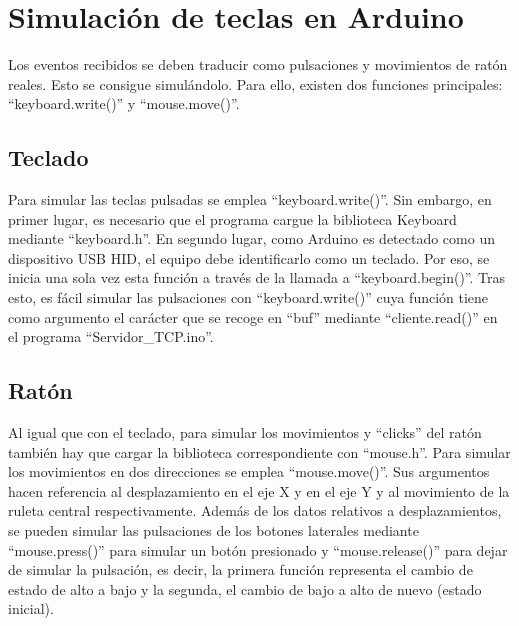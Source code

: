 \section{Simulación de teclas en Arduino} \label{s3_6}

Los eventos recibidos se deben traducir como pulsaciones y movimientos de ratón reales. Esto se consigue simulándolo. Para ello, existen dos funciones principales: ``keyboard.write()'' y ``mouse.move()''.

\subsection{Teclado} \label{s3_6_1}

Para simular las teclas pulsadas se emplea ``keyboard.write()''. Sin embargo, en primer lugar, es necesario que el programa cargue la biblioteca Keyboard mediante ``keyboard.h''. En segundo lugar, como Arduino es detectado como un dispositivo USB HID, el equipo debe identificarlo como un teclado. Por eso, se inicia una sola vez esta función a través de la llamada a ``keyboard.begin()''. Tras esto, es fácil simular las pulsaciones con ``keyboard.write()'' cuya función tiene como argumento el carácter que se recoge en ``buf'' mediante ``cliente.read()'' en el programa ``Servidor\_TCP.ino''.

\subsection{Ratón} \label{s3_6_2}

Al igual que con el teclado, para simular los movimientos y ``clicks'' del ratón también hay que cargar la biblioteca correspondiente con ``mouse.h''. Para simular los movimientos en dos direcciones se emplea ``mouse.move()''. Sus argumentos hacen referencia al desplazamiento en el eje X y en el eje Y y al movimiento de la ruleta central respectivamente. Además de los datos relativos a desplazamientos, se pueden simular las pulsaciones de los botones laterales mediante ``mouse.press()'' para simular un botón presionado y ``mouse.release()'' para dejar de simular la pulsación, es decir, la primera función representa el cambio de estado de alto a bajo y la segunda, el cambio de bajo a alto de nuevo (estado inicial).















